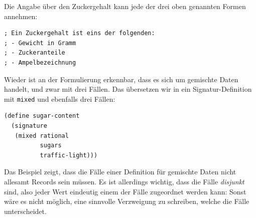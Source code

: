 %
Die Angabe über den Zuckergehalt kann jede der drei oben genannten Formen
annehmen:
%
\begin{lstlisting}
; Ein Zuckergehalt ist eins der folgenden:
; - Gewicht in Gramm
; - Zuckeranteile
; - Ampelbezeichnung
\end{lstlisting}
%
Wieder ist an der Formulierung erkennbar, dass es sich um gemischte
Daten handelt, und zwar mit drei Fällen.  Das übersetzen wir in ein
Signatur-Definition mit \lstinline{mixed} und ebenfalls drei Fällen:
%
\begin{lstlisting}
(define sugar-content
  (signature
   (mixed rational
          sugars
          traffic-light)))
\end{lstlisting}
%
Das Beispiel zeigt, dass die Fälle einer Definition für gemischte Daten
nicht allesamt Records sein müssen.  Es ist allerdings wichtig, dass
die Fälle \emph{disjunkt} sind, also jeder Wert eindeutig einem der
Fälle zugeordnet werden kann: Sonst wäre es nicht möglich, eine sinnvolle
Verzweigung zu schreiben, welche die Fälle unterscheidet.

